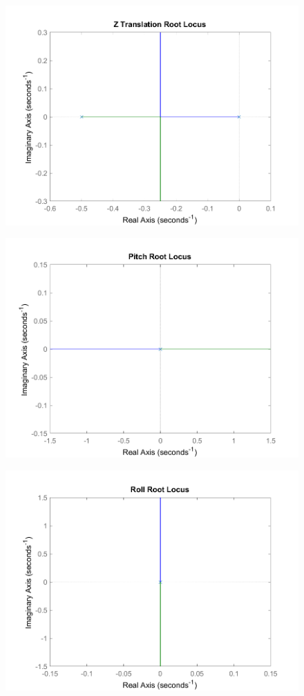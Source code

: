 \documentclass[12pt]{article}
\begin{document}
\begin{figure}[h]
\includegraphics[width=0.75\linewidth]{images/Z_rootlocus.png}
\centering
\caption{}
\end{figure}

\begin{figure}[h]
\includegraphics[width=0.75\linewidth]{images/Pitch_rootlocus.png}
\centering
\caption{}
\end{figure}

\begin{figure}[h]
\includegraphics[width=0.75\linewidth]{images/Roll_rootlocus.png}
\centering
\caption{}
\end{figure}
\end{document}
